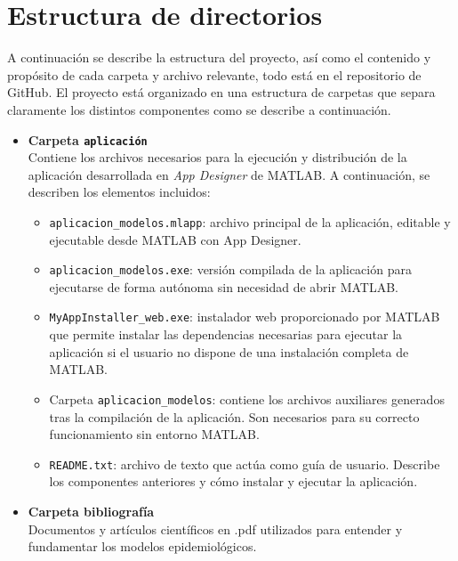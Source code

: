 
\section{Estructura de directorios}
A continuación se describe la estructura del proyecto, así como el contenido y propósito de cada carpeta y archivo relevante, todo está en el repositorio de GitHub. El proyecto está organizado en una estructura de carpetas que separa claramente los distintos componentes como se describe a continuación.

\begin{itemize}
    \item \textbf{Carpeta \texttt{aplicación}} \\

Contiene los archivos necesarios para la ejecución y distribución de la aplicación desarrollada en \textit{App Designer} de MATLAB. A continuación, se describen los elementos incluidos:

\begin{itemize}
    \item \texttt{aplicacion\_modelos.mlapp}: archivo principal de la aplicación, editable y ejecutable desde MATLAB con App Designer.
    
    \item \texttt{aplicacion\_modelos.exe}: versión compilada de la aplicación para ejecutarse de forma autónoma sin necesidad de abrir MATLAB.
    
    \item \texttt{MyAppInstaller\_web.exe}: instalador web proporcionado por MATLAB que permite instalar las dependencias necesarias para ejecutar la aplicación si el usuario no dispone de una instalación completa de MATLAB.
    
    \item Carpeta \texttt{aplicacion\_modelos}: contiene los archivos auxiliares generados tras la compilación de la aplicación. Son necesarios para su correcto funcionamiento sin entorno MATLAB.
    
    \item \texttt{README.txt}: archivo de texto que actúa como guía de usuario. Describe los componentes anteriores y cómo instalar y ejecutar la aplicación.
\end{itemize}


    \item \textbf{Carpeta bibliografía} \\
    Documentos y artículos científicos en .pdf utilizados para entender y fundamentar los modelos epidemiológicos.


\end{itemize}
